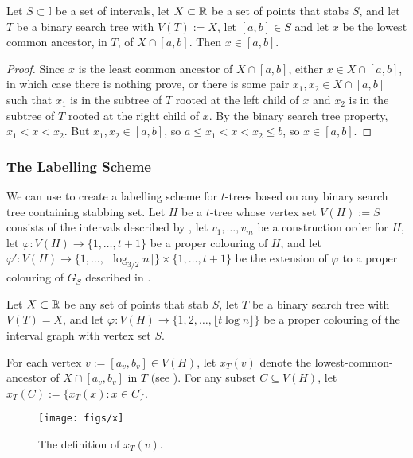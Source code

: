\documentclass[kpfonts]{patmorin}
\begin{document}
\begin{lem}
  Let $S\subset\mathbb{I}$ be a set of intervals, let $X\subset\mathbb{R}$ be a set of points that stabs $S$, and let $T$ be a binary search tree with $V(T):=X$, let $[a,b]\in S$ and let $x$ be the lowest common ancestor, in $T$, of $X\cap [a,b]$.  Then $x\in [a,b]$.
\end{lem}

\begin{proof}
  Since $x$ is the least common ancestor of $X\cap[a,b]$, either $x\in X\cap[a,b]$, in which case there is nothing prove, or there is some pair $x_1,x_2\in X\cap[a,b]$ such that $x_1$ is in the subtree of $T$ rooted at the left child of $x$ and $x_2$ is in the subtree of $T$ rooted at the right child of $x$.  By the binary search tree property, $x_1<x<x_2$. But $x_1,x_2 \in [a,b]$, so $a\le x_1<x<x_2\le b$, so $x\in [a,b]$.  
\end{proof}

\subsubsection{The Labelling Scheme}

We can use  to create a labelling scheme for $t$-trees based on any binary search tree containing stabbing set.  Let $H$ be a $t$-tree whose vertex set $V(H):=S$ consists of the intervals described by , let $v_1,\ldots,v_m$ be a construction order for $H$, let $\varphi:V(H)\to\{1,\ldots,t+1\}$ be a proper colouring of $H$, and let $\varphi':V(H)\to\{1,\ldots,\lceil\log_{3/2} n\rceil\}\times\{1,\ldots,t+1\}$ be the extension of $\varphi$ to a proper colouring of $G_S$ described in .

Let $X\subset\mathbb{R}$ be any set of points that stab $S$, let $T$ be a binary search tree with $V(T)=X$, and let $\varphi:V(H)\to\{1,2,\ldots,\lfloor t\log n\rfloor\}$ be a proper colouring of the interval graph with vertex set $S$.

For each vertex $v:=[a_v,b_v]\in V(H)$, let $x_T(v)$ denote the lowest-common-ancestor of $X\cap [a_v,b_v]$ in $T$ (see ).  For any subset $C\subseteq V(H)$, let $x_T(C):=\{x_T(x):x\in C\}$.  

\begin{figure}
  \begin{center}
    \texttt{[image: figs/x]}
  \end{center}
  \caption{The definition of $x_T(v)$.}
\end{figure}
\end{document}
